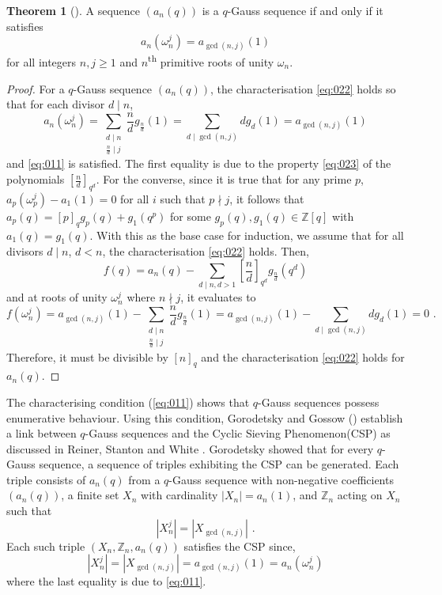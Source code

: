 \documentclass{article}
\numberwithin{equation}{section}
\theoremstyle{definition}
\newtheorem*{theorem*}{Theorem}
\begin{document}
\begin{theorem*}[]
A sequence $(a_n(q))$ is a $q$-Gauss sequence if and only if it satisfies
\begin{equation}\label{eq:011}
    a_n(\omega_n^j)=a_{\gcd(n,j)}(1)
\end{equation}
for all integers $n,j\geq1$ and $n$\textsuperscript{th} primitive roots of unity $\omega_n$.
\end{theorem*}
\begin{proof}
    For a $q$-Gauss sequence $(a_n(q))$, the characterisation \eqref{eq:022} holds so that for each divisor $d\mid n$, 
    \[a_n(\omega_n^j)=\sum_{\substack{d\mid n\\\frac{n}{d}\mid j}}\frac{n}{d}g_\frac{n}{d}(1)=\sum_{d\mid\gcd(n,j)}dg_d(1)=a_{\gcd(n,j)}(1)\] 
    and \eqref{eq:011} is satisfied. The first equality is due to the property \eqref{eq:023} of the polynomials $[\frac{n}{d}]_{q^d}$. For the converse, since it is true that for any prime $p$, $a_p(\omega_p^j)-a_1(1)=0$ for all $i$ such that $p\nmid j$, it follows that $a_p(q)=[p]_qg_p(q)+g_1(q^p)$ for some $g_p(q),g_1(q)\in\mathbb{Z}[q]$ with $a_1(q)=g_1(q)$. With this as the base case for induction, we assume that for all divisors $d\mid n$, $d<n$, the characterisation \eqref{eq:022} holds. Then,  
    \[f(q)=a_n(q)-\sum_{d\mid n, d>1}\left[\frac{n}{d}\right]_{q^d}g_\frac{n}{d}(q^d)\]
    and at roots of unity $\omega_n^j$ where $n\nmid j$, it evaluates to
    \[f(\omega_n^j)=a_{\gcd(n,j)}(1)-\sum_{\substack{d\mid n\\\frac{n}{d}\mid j}}\frac{n}{d}g_\frac{n}{d}(1)=a_{\gcd(n,j)}(1)-\sum_{d\mid\gcd(n,j)}dg_d(1)=0\text{ .}\]
    Therefore, it must be divisible by $[n]_q$ and the characterisation \eqref{eq:022} holds for $a_n(q)$. 
\end{proof}
The characterising condition (\ref{eq:011}) shows that $q$-Gauss sequences possess enumerative behaviour. Using this condition, Gorodetsky \cite{goro_q-gauss} and Gossow (\cite{fern_gauss}) establish a link between $q$-Gauss sequences and the Cyclic Sieving Phenomenon(CSP) as discussed in Reiner, Stanton and White \cite{csp}. Gorodetsky \cite{goro_q-gauss} showed that for every $q$-Gauss sequence, a sequence of triples exhibiting the CSP can be generated. Each triple consists of $a_n(q)$ from a $q$-Gauss sequence with non-negative coefficients $(a_n(q))$, a finite set $X_n$ with cardinality $|X_n|=a_n(1)$, and $\mathbb{Z}_n$ acting on $X_n$ such that
\[|X_n^j| = |X_{\gcd(n,j)}|\text{ .}\] 
 Each such triple $(X_n, \mathbb{Z}_n, a_n(q))$ satisfies the CSP since, 
\[|X_n^j|=|X_{\gcd(n,j)}|=a_{\gcd(n,j)}(1)=a_n(\omega_n^j)\]
where the last equality is due to \eqref{eq:011}.  
\end{document}
